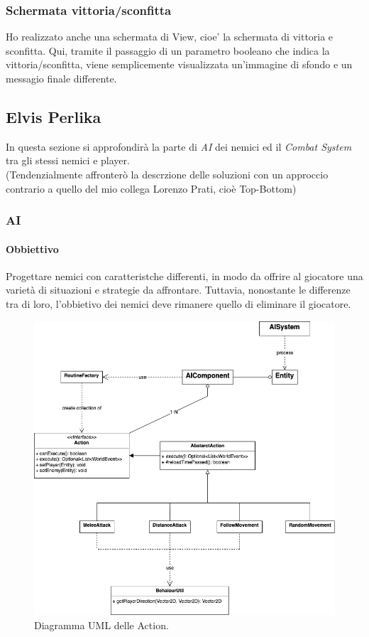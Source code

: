 \documentclass[a4paper,12pt]{report}
\begin{document}
\subsubsection{Schermata vittoria/sconfitta}
Ho realizzato anche una schermata di View, cioe' la schermata di vittoria e sconfitta. Qui, tramite il passaggio di un parametro booleano che indica la vittoria/sconfitta, viene semplicemente visualizzata un'immagine di sfondo e un messagio finale differente.


\subsection{Elvis Perlika}
In questa sezione si approfondirà la parte di \textit{AI} dei nemici
ed il \textit{Combat System} tra gli stessi nemici e player.\\
(Tendenzialmente affronterò la descrzione delle soluzioni con un approccio contrario a quello
del mio collega Lorenzo Prati, cioè Top-Bottom)

\subsubsection{AI}

\paragraph{Obbiettivo}
Progettare nemici con caratteristche differenti, in modo
da offrire al giocatore una varietà di situazioni e strategie da affrontare.
Tuttavia, nonostante le differenze tra di loro, l'obbietivo dei nemici deve
rimanere quello di eliminare il giocatore.
\begin{figure}[h]
	\centering
	\includegraphics[width=\textwidth]{uml/UML_AI.png}
	\caption{Diagramma UML delle Action.}
\end{figure}
\end{document}
